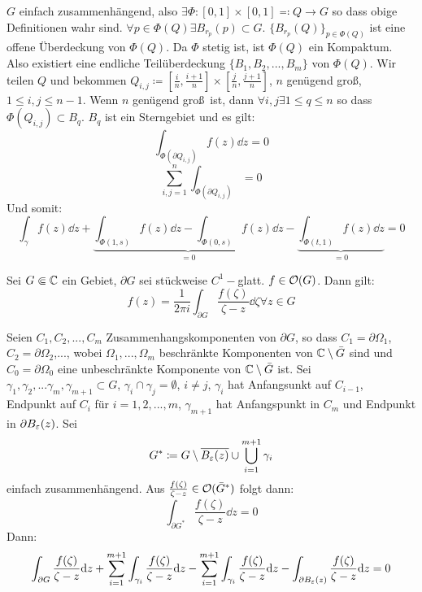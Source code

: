 \begin{beweis}
	$ G $ einfach zusammenh\"angend, also $ \exists\Phi\colon[0,1]\times[0,1]\eqqcolon Q\rightarrow G $ so dass obige Definitionen wahr sind. $ \forall p\in \Phi(Q)\exists B_{r_p}(p)\subset G $. $ \lbrace B_{r_p}(Q)\rbrace_{p\in\Phi(Q)} $ ist eine offene \"Uberdeckung von $ \Phi(Q) $. Da $ \Phi $ stetig ist, ist $ \Phi(Q) $ ein Kompaktum. Also existiert eine endliche Teil\"uberdeckung $ \lbrace B_1,B_2,...,B_m\rbrace $ von $ \Phi(Q) $. Wir teilen $ Q $ und bekommen $ Q_{i,j}\coloneqq\left\lbrack\frac{i}{n},\frac{i+1}{n}\right\rbrack\times\left\lbrack\frac{j}{n},\frac{j+1}{n}\right\rbrack $, $ n $ gen\"ugend gro\ss, $ 1\leq i,j\leq n-1 $. Wenn $ n $ gen\"ugend gro\ss\ ist, dann $ \forall i,j\exists 1\leq q\leq n $ so dass $ \Phi(Q_{i,j})\subset B_q $. $ B_q $ ist ein Sterngebiet und es gilt:
	\[ \int_{\Phi(\partial Q_{i,j})}^{} f(z)\dd z=0 \]
	\[ \sum_{i,j=1}^n\int_{\Phi(\partial Q_{i,j})}^{}=0 \]
	Und somit:
	\[ \int_{\gamma}^{}f(z)\dd z+\underbrace{\int_{\Phi(1,s)}^{}f(z)\dd z-\int_{\Phi(0,s)}^{}f(z)\dd z}_{=0}-\underbrace{\int_{\Phi(t,1)}^{}f(z)\dd z}_{=0}=0 \]
\end{beweis}
\begin{satz}
	Sei $ G\Subset\mathbb{C} $ ein Gebiet, $ \partial G $ sei st\"uckweise $ C^1- $glatt. $ f\in\mathcal O(G) $. Dann gilt:
	\[ f(z)=\frac{1}{2\pi i}\int_{\partial G}^{}\frac{f(\zeta)}{\zeta-z}\dd\zeta\forall z\in G \]
\end{satz}
\begin{beweis}
	Seien $ C_1,C_2,...,C_m $ Zusammenhangskomponenten von $ \partial G $, so dass $ C_1=\partial\Omega_1 $, $ C_2=\partial\Omega_2 $,..., wobei $ \Omega_1,...,\Omega_m $ beschr\"ankte Komponenten von $ \mathbb{C}\setminus\bar G $ sind und $ C_0=\partial\Omega_0 $ eine unbeschr\"ankte Komponente von $ \mathbb{C}\setminus\bar G $ ist. Sei $ \gamma_1,\gamma_2,...\gamma_m,\gamma_{m+1}\subset G $, $ \gamma_i\cap\gamma_j=\emptyset $, $ i\neq j $, $ \gamma_i $ hat Anfangsunkt auf $ C_{i-1} $, Endpunkt auf $ C_i $ f\"ur $ i=1,2,...,m $, $ \gamma_{m+1} $ hat Anfangspunkt in $ C_m $ und Endpunkt in $ \partial B_\varepsilon(z) $. Sei \[ G^\ast\coloneqq G\setminus \overline{B_\varepsilon(z)}\cup\bigcup_{i=1}^{m+1}\gamma_i \] einfach zusammenh\"angend. Aus $ \frac{f(\zeta)}{\zeta-z}\in\mathcal O(\bar G^\ast) $ folgt dann:
	\[ \int_{\partial G^\ast}^{} \frac{f(\zeta)}{\zeta-z}\dd z=0 \]
	Dann:
	\[ \int_{\partial G}^{} \frac{f(\zeta)}{\zeta-z}\mathrm d z+\sum_{i=1}^{m+1}\int_{\gamma_i}^{}\frac{f(\zeta)}{\zeta-z}\mathrm d z-\sum_{i=1}^{m+1}\int_{\gamma_i}^{}\frac{f(\zeta)}{\zeta-z}\mathrm d z-\int_{\partial B_\varepsilon(z)}^{}\frac{f(\zeta)}{\zeta-z}\mathrm d z=0 \]
\end{beweis}
